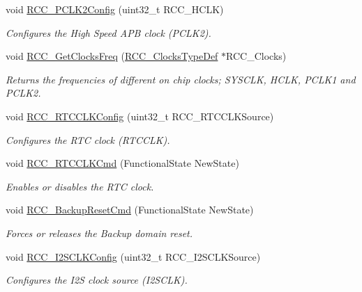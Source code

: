 \begin{DoxyCompactItemize}
void \hyperlink{group___r_c_c_ga09f9c010a4adca9e036da42c2ca6126a}{R\-C\-C\-\_\-\-P\-C\-L\-K2\-Config} (uint32\-\_\-t R\-C\-C\-\_\-\-H\-C\-L\-K)
\begin{DoxyCompactList}\small\item\em Configures the High Speed A\-P\-B clock (P\-C\-L\-K2). \end{DoxyCompactList}\item 
void \hyperlink{group___r_c_c_ga3e9944fd1ed734275222bbb3e3f29993}{R\-C\-C\-\_\-\-Get\-Clocks\-Freq} (\hyperlink{struct_r_c_c___clocks_type_def}{R\-C\-C\-\_\-\-Clocks\-Type\-Def} $\ast$R\-C\-C\-\_\-\-Clocks)
\begin{DoxyCompactList}\small\item\em Returns the frequencies of different on chip clocks; S\-Y\-S\-C\-L\-K, H\-C\-L\-K, P\-C\-L\-K1 and P\-C\-L\-K2. \end{DoxyCompactList}\item 
void \hyperlink{group___r_c_c_ga1473d8a5a020642966359611c44181b0}{R\-C\-C\-\_\-\-R\-T\-C\-C\-L\-K\-Config} (uint32\-\_\-t R\-C\-C\-\_\-\-R\-T\-C\-C\-L\-K\-Source)
\begin{DoxyCompactList}\small\item\em Configures the R\-T\-C clock (R\-T\-C\-C\-L\-K). \end{DoxyCompactList}\item 
void \hyperlink{group___r_c_c_ga9802f84846df2cea8e369234ed13b159}{R\-C\-C\-\_\-\-R\-T\-C\-C\-L\-K\-Cmd} (Functional\-State New\-State)
\begin{DoxyCompactList}\small\item\em Enables or disables the R\-T\-C clock. \end{DoxyCompactList}\item 
void \hyperlink{group___r_c_c_ga636c3b72f35391e67f12a551b15fa54a}{R\-C\-C\-\_\-\-Backup\-Reset\-Cmd} (Functional\-State New\-State)
\begin{DoxyCompactList}\small\item\em Forces or releases the Backup domain reset. \end{DoxyCompactList}\item 
void \hyperlink{group___r_c_c_ga6c56f8529988fcc8f4dbffbc1bab27d0}{R\-C\-C\-\_\-\-I2\-S\-C\-L\-K\-Config} (uint32\-\_\-t R\-C\-C\-\_\-\-I2\-S\-C\-L\-K\-Source)
\begin{DoxyCompactList}\small\item\em Configures the I2\-S clock source (I2\-S\-C\-L\-K). \end{DoxyCompactList}\item 

\end{DoxyCompactItemize}
